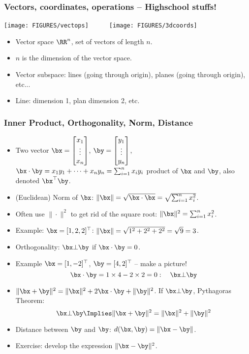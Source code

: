 \documentclass[8pt]{beamer}
\newcommand{\myemph}[1]{{\color{blue}{#1}}}
\begin{document}
\begin{frame}
  \frametitle{Vectors, coordinates, operations -- Highschool stuffs!}
  \begin{center}
     \texttt{[image: FIGURES/vectops]}~~~~~~\texttt{[image: FIGURES/3dcoords]}
  \end{center}
  \begin{itemize}
  \item Vector space $\RR^n$, set of vectors of length $n$. 
  \item $n$ is the dimension of the vector space.
  \item Vector subspace: lines (going through origin), planes (going through origin), etc...
  \item Line: dimension 1, plan dimension 2, etc.
  \end{itemize}
\end{frame}


\begin{frame}
  \frametitle{Inner Product, Orthogonality, Norm, Distance}
  \begin{itemize}[<+->]
  \item Two vector
    $ \bx = \begin{bmatrix}
      x_1\\\vdots\\ x_n
    \end{bmatrix}
    $,
    $ \by = \begin{bmatrix}
      y_1\\\vdots\\ y_n
    \end{bmatrix}$,
    $\bx\cdot\by = x_1y_1 + \dots + x_n y_n = \sum_{i=1}^nx_i y_i$
    \myemph{Inner/Dot/Scalar} product of $\bx$ and $\by$, also denoted $\bx^\top \by$.
  \item (Euclidean) Norm of $\bx$: $\|\bx\| = \sqrt{\bx\cdot\bx} = \sqrt{\sum_{i=1}^n x_i^2}$.
  \item Often use $\|\cdot\|^2$ to get rid of the square root: $\|\bx\|^2 = \sum_{i=1}^n x_i^2$.
  \item Example: $\bx = [1, 2, 2]^\top$: $\|\bx\| = \sqrt{1^2 + 2^2 + 2^2} = \sqrt{9} = 3$.
  \item Orthogonality: $\bx\bot\by$ if $\bx\cdot\by = 0$. 
  \item Example $\bx = [1, -2]^\top$, $\by = [4, 2]^\top$ -- make a picture!
    $$
    \bx\cdot\by = 1\times 4 - 2\times 2 = 0:\quad \bx\bot \by 
    $$
  \item $\|\bx + \by\|^2 = \|\bx\|^2 + 2\bx\cdot\by + \|\by\|^2$. If $\bx\bot\by$, Pythagoras Theorem:
    $$
    \bx\bot\by\Implies \|\bx + \by\|^2 = \|\bx\|^2  + \|\by\|^2
    $$
    \item Distance between $\by$ and $\by$: $d(\bx,\by) = \|\bx - \by\|$.
    \item Exercise: develop the expression $\|\bx-\by\|^2$.
   \end{itemize}
\end{frame}
\end{document}
